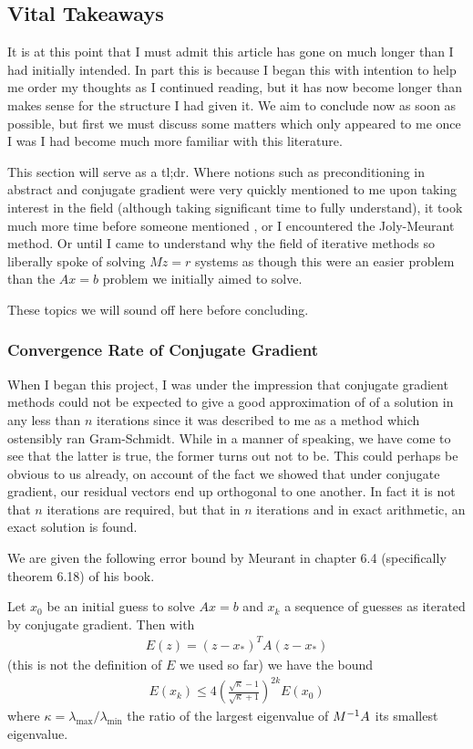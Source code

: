 \documentclass[11pt]{article}
\begin{document}
\subsection{Vital Takeaways}

It is at this point that I must admit this article has gone on much longer than I had initially intended. In part this is because I began this with intention to help me order my thoughts as I continued reading, but it has now become longer than makes sense for the structure I had given it. We aim to conclude now as soon as possible, but first we must discuss some matters which only appeared to me once I was I had become much more familiar with this literature.

This section will serve as a  tl;dr. Where notions such as preconditioning in abstract and conjugate gradient were very quickly mentioned to me upon taking interest in the field (although taking significant time to fully understand), it took much more time before someone mentioned , or I encountered the Joly-Meurant method. Or until I came to understand why the field of iterative methods so liberally spoke of solving $Mz = r$ systems as though this were an easier problem than the $Ax=b$ problem we initially aimed to solve.

These topics we will sound off here before concluding.

\subsubsection{Convergence Rate of Conjugate Gradient}

When I began this project, I was under the impression that conjugate gradient methods could not be expected to give a good approximation of of a solution in any less than $n$ iterations since it was described to me as a method which ostensibly ran Gram-Schmidt. While in a manner of speaking, we have come to see that the latter is true, the former turns out not to be. This could perhaps be obvious to us already, on account of the fact we showed that under conjugate gradient, our residual vectors end up orthogonal to one another. In fact it is not that $n$ iterations are required, but that in $n$ iterations and in exact arithmetic, an exact solution is found.

We are given the following error bound by Meurant in chapter 6.4 (specifically theorem 6.18) of his book. \begin{theorem}
Let $x_0$ be an initial guess to solve $Ax = b$ and $x_k$ a sequence of guesses as iterated by conjugate gradient. Then with \begin{gather*}
E(z) = (z - x_*)^T A (z - x_*)
\end{gather*}
(this is not the definition of $E$ we used so far) we have the bound \begin{gather*}
E(x_k) \le 4 \left( \frac{\sqrt{\kappa} - 1}{\sqrt{\kappa} + 1} \right)^{2k} E(x_0)
\end{gather*}
where $\kappa = \lambda_{\text{max}}/\lambda_{\text{min}}$ the ratio of the largest eigenvalue of $M^{-1} A$ its smallest eigenvalue.
\end{theorem}
\end{document}
